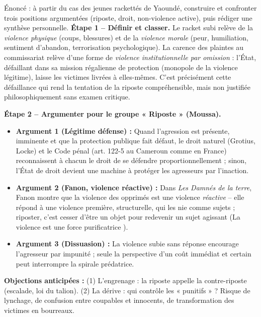 \documentclass[11pt]{article}
\newcounter{popsec}
\newcounter{popsub}
\newcommand{\courssub}[1]{%
  \stepcounter{popsub}%
  \par\vspace{9pt}\noindent{\popxbold\fontsize{11.5}{13}\selectfont\color{popink}{\color{poporange}\thepopsec.\thepopsub}\hspace{6pt}#1}\par\nopagebreak\vspace{4pt}
}
\begin{document}
\courssub{Démarche et corrigé commenté}

\begin{exoresolu}
Énoncé : à partir du cas des jeunes rackettés de Yaoundé, construire et confronter trois positions argumentées (riposte, droit, non-violence active), puis rédiger une synthèse personnelle.
\tcblower
\textbf{Étape 1 -- Définir et classer.} Le racket subi relève de la \emph{violence physique} (coups, blessures) et de la \emph{violence morale} (peur, humiliation, sentiment d'abandon, terrorisation psychologique). La carence des plaintes au commissariat relève d'une forme de \emph{violence institutionnelle par omission} : l'État, défaillant dans sa mission régalienne de protection (monopole de la violence légitime), laisse les victimes livrées à elles-mêmes. C'est précisément cette défaillance qui rend la tentation de la riposte compréhensible, mais non justifiée philosophiquement sans examen critique.

\textbf{Étape 2 -- Argumenter pour le groupe « Riposte » (Moussa).}
\begin{itemize}
\item \textbf{Argument 1 (Légitime défense) :} Quand l'agression est présente, imminente et que la protection publique fait défaut, le droit naturel (Grotius, Locke) et le Code pénal (art. 122-5 au Cameroun comme en France) reconnaissent à chacun le droit de se défendre proportionnellement ; sinon, l'État de droit devient une machine à protéger les agresseurs par l'inaction.
\item \textbf{Argument 2 (Fanon, violence réactive) :} Dans \emph{Les Damnés de la terre}, Fanon montre que la violence des opprimés est une violence \emph{réactive} -- elle répond à une violence première, structurelle, qui les nie comme sujets ; riposter, c'est cesser d'être un objet pour redevenir un sujet agissant (\guillemotleft La violence est une force purificatrice \guillemotright).
\item \textbf{Argument 3 (Dissuasion) :} La violence subie sans réponse encourage l'agresseur par impunité ; seule la perspective d'un coût immédiat et certain peut interrompre la spirale prédatrice.
\end{itemize}
\textbf{Objections anticipées :} (1) L'engrenage : la riposte appelle la contre-riposte (escalade, loi du talion). (2) La dérive : qui contrôle les « punitifs » ? Risque de lynchage, de confusion entre coupables et innocents, de transformation des victimes en bourreaux.


\end{exoresolu}
\end{document}
